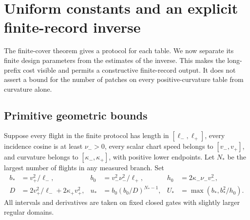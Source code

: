 \section{Uniform constants and an explicit finite-record inverse}
\label{sec:v78-uniform}

The finite-cover theorem gives a protocol for each table.  We now
separate its finite design parameters from the estimates of the inverse.
This makes the long-prefix cost visible and permits a constructive
finite-record output.  It does not assert a bound for the number of
patches on every positive-curvature table from curvature alone.

\subsection{Primitive geometric bounds}
Suppose every flight in the finite protocol has length in
$[\ell_-,\ell_+]$, every incidence cosine is at least $\nu_->0$,
every scalar chart speed belongs to $[v_-,v_+]$, and curvature belongs
to $[\kappa_-,\kappa_+]$, with positive lower endpoints.  Let $N_* $
be the largest number of flights in any measured branch.  Set
\begin{align*}
 b_*&=v_+^2/\ell_-,&
 b_0&=v_-^2\nu_-^2/\ell_+,&
 h_0&=2\kappa_-\nu_-v_-^2,\\
 D&=2v_+^2/\ell_-+2\kappa_+v_+^2,&
 u_*&=b_0(b_0/D)^{N_*-1},&
 U_*&=\max(b_*,b_*^2/h_0).
\end{align*}
All intervals and derivatives are taken on fixed closed gates with
slightly larger regular domains.

